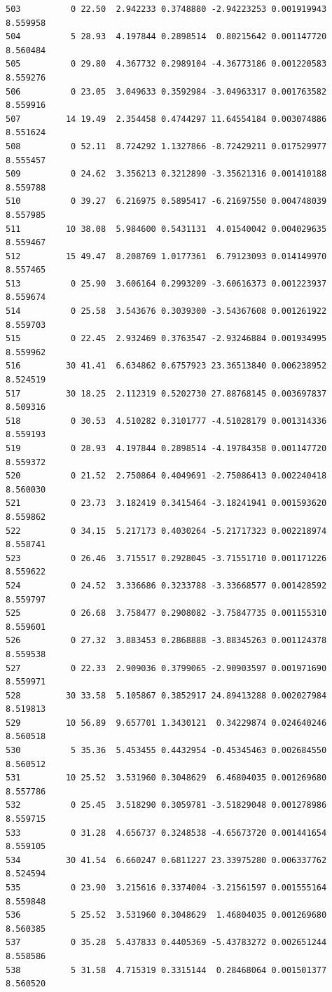 \documentclass[]{book}
\theoremstyle{definition}
\theoremstyle{definition}
\theoremstyle{definition}
\theoremstyle{remark}
\begin{document}
\begin{verbatim}
503          0 22.50  2.942233 0.3748880 -2.94223253 0.001919943 8.559958
504          5 28.93  4.197844 0.2898514  0.80215642 0.001147720 8.560484
505          0 29.80  4.367732 0.2989104 -4.36773186 0.001220583 8.559276
506          0 23.05  3.049633 0.3592984 -3.04963317 0.001763582 8.559916
507         14 19.49  2.354458 0.4744297 11.64554184 0.003074886 8.551624
508          0 52.11  8.724292 1.1327866 -8.72429211 0.017529977 8.555457
509          0 24.62  3.356213 0.3212890 -3.35621316 0.001410188 8.559788
510          0 39.27  6.216975 0.5895417 -6.21697550 0.004748039 8.557985
511         10 38.08  5.984600 0.5431131  4.01540042 0.004029635 8.559467
512         15 49.47  8.208769 1.0177361  6.79123093 0.014149970 8.557465
513          0 25.90  3.606164 0.2993209 -3.60616373 0.001223937 8.559674
514          0 25.58  3.543676 0.3039300 -3.54367608 0.001261922 8.559703
515          0 22.45  2.932469 0.3763547 -2.93246884 0.001934995 8.559962
516         30 41.41  6.634862 0.6757923 23.36513840 0.006238952 8.524519
517         30 18.25  2.112319 0.5202730 27.88768145 0.003697837 8.509316
518          0 30.53  4.510282 0.3101777 -4.51028179 0.001314336 8.559193
519          0 28.93  4.197844 0.2898514 -4.19784358 0.001147720 8.559372
520          0 21.52  2.750864 0.4049691 -2.75086413 0.002240418 8.560030
521          0 23.73  3.182419 0.3415464 -3.18241941 0.001593620 8.559862
522          0 34.15  5.217173 0.4030264 -5.21717323 0.002218974 8.558741
523          0 26.46  3.715517 0.2928045 -3.71551710 0.001171226 8.559622
524          0 24.52  3.336686 0.3233788 -3.33668577 0.001428592 8.559797
525          0 26.68  3.758477 0.2908082 -3.75847735 0.001155310 8.559601
526          0 27.32  3.883453 0.2868888 -3.88345263 0.001124378 8.559538
527          0 22.33  2.909036 0.3799065 -2.90903597 0.001971690 8.559971
528         30 33.58  5.105867 0.3852917 24.89413288 0.002027984 8.519813
529         10 56.89  9.657701 1.3430121  0.34229874 0.024640246 8.560518
530          5 35.36  5.453455 0.4432954 -0.45345463 0.002684550 8.560512
531         10 25.52  3.531960 0.3048629  6.46804035 0.001269680 8.557786
532          0 25.45  3.518290 0.3059781 -3.51829048 0.001278986 8.559715
533          0 31.28  4.656737 0.3248538 -4.65673720 0.001441654 8.559105
534         30 41.54  6.660247 0.6811227 23.33975280 0.006337762 8.524594
535          0 23.90  3.215616 0.3374004 -3.21561597 0.001555164 8.559848
536          5 25.52  3.531960 0.3048629  1.46804035 0.001269680 8.560385
537          0 35.28  5.437833 0.4405369 -5.43783272 0.002651244 8.558586
538          5 31.58  4.715319 0.3315144  0.28468064 0.001501377 8.560520

\end{verbatim}
\end{document}
